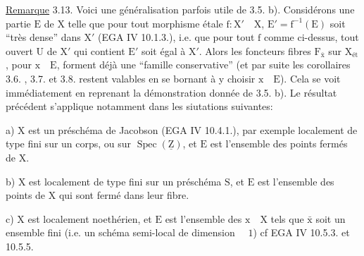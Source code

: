\uline{Remarque} 3.13. Voici une généralisation parfois utile de 3.5. b). Considérons
une partie $\mathrm{E}$ de $\mathrm{X}$ telle que pour tout morphisme étale $\mathrm{f:X'\quad X}$, $\mathrm{E'=f^{-1}(E)}$
soit ``très dense'' dans $\mathrm{X'}$ (EGA IV 10.1.3.), i.e. que pour tout $\mathrm{f}$ comme ci-dessus,
tout ouvert $\mathrm{U}$ de $\mathrm{X'}$ qui contient $\mathrm{E'}$ soit égal à $\mathrm{X'}$. Alors les foncteurs
fibres $\mathrm{F_{\bar x}}$ sur $\mathrm{X_{\text{ét}}}$, pour $\mathrm{x\quad E}$, forment déjà une ``famille conservative''
(et par suite les corollaires 3.6. , 3.7. et 3.8. restent valables
en se bornant à y choisir $\mathrm{x\quad E}$). Cela se voit immédiatement en reprenant la
démonstration donnée de 3.5. b). Le résultat précédent s'applique notamment
dans les siutations suivantes:

a) $\mathrm{X}$ est un préschéma de Jacobson (EGA IV 10.4.1.), par exemple localement
de type fini sur un corps, ou sur $\mathrm{\operatorname{Spec}(\underline{Z})}$, et $\mathrm{E}$ est l'ensemble des
points fermés de $\mathrm{X}$.

b) $\mathrm{X}$ est localement de type fini sur un préschéma $\mathrm{S}$, et $\mathrm{E}$ est l'ensemble
des points de $\mathrm{X}$ qui sont fermé dans leur fibre.

c) $\mathrm{X}$ est localement noethérien, et $\mathrm{E}$ est l'ensemble des $\mathrm{x\quad X}$ tels que
$\mathrm{\bar x}$ soit un ensemble fini (i.e. un schéma semi-local de dimension $\mathrm{\quad 1}$) cf
EGA IV 10.5.3. et 10.5.5.

